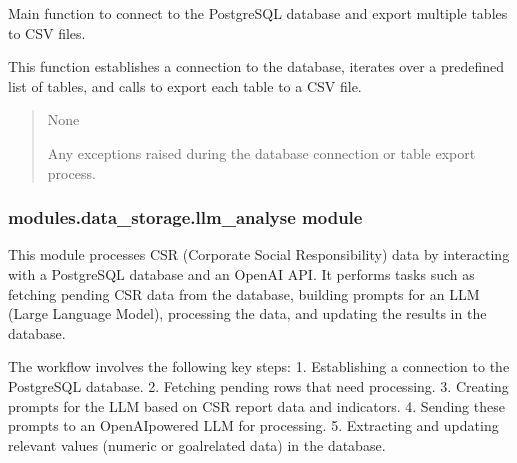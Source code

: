 \documentclass[letterpaper,10pt,english]{sphinxmanual}
\begin{document}

\begin{fulllineitems}
\label{\detokenize{modules.data_storage:modules.data_storage.data_export.main}}
\pysigstartsignatures
\pysiglinewithargsret
{}
{}
{}
\pysigstopsignatures
\sphinxAtStartPar
Main function to connect to the PostgreSQL database and export multiple tables to CSV files.

\sphinxAtStartPar
This function establishes a connection to the database, iterates over a predefined
list of tables, and calls  to export each table to a CSV file.
\begin{quote}\begin{description}
\sphinxAtStartPar
None

\sphinxAtStartPar
Any exceptions raised during the database connection or table export process.

\end{description}\end{quote}

\end{fulllineitems}



\subsubsection{modules.data\_storage.llm\_analyse module}
\label{\detokenize{modules.data_storage:module-modules.data_storage.llm_analyse}}\label{\detokenize{modules.data_storage:modules-data-storage-llm-analyse-module}}
\sphinxAtStartPar
This module processes CSR (Corporate Social Responsibility) data by interacting with a PostgreSQL database
and an OpenAI API. It performs tasks such as fetching pending CSR data from the database, building prompts
for an LLM (Large Language Model), processing the data, and updating the results in the database.

\sphinxAtStartPar
The workflow involves the following key steps:
1. Establishing a connection to the PostgreSQL database.
2. Fetching pending rows that need processing.
3. Creating prompts for the LLM based on CSR report data and indicators.
4. Sending these prompts to an OpenAI\sphinxhyphen{}powered LLM for processing.
5. Extracting and updating relevant values (numeric or goal\sphinxhyphen{}related data) in the database.
\end{document}
